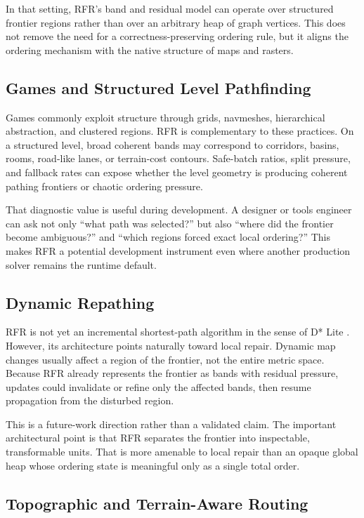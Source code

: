 \documentclass[11pt]{article}
\newcommand{\RFR}{\textsc{RFR}}
\begin{document}
In that setting, \RFR{}'s band and residual model can operate over structured frontier regions rather than over an arbitrary heap of graph vertices. This does not remove the need for a correctness-preserving ordering rule, but it aligns the ordering mechanism with the native structure of maps and rasters.

\subsection{Games and Structured Level Pathfinding}

Games commonly exploit structure through grids, navmeshes, hierarchical abstraction, and clustered regions. \RFR{} is complementary to these practices. On a structured level, broad coherent bands may correspond to corridors, basins, rooms, road-like lanes, or terrain-cost contours. Safe-batch ratios, split pressure, and fallback rates can expose whether the level geometry is producing coherent pathing frontiers or chaotic ordering pressure.

That diagnostic value is useful during development. A designer or tools engineer can ask not only ``what path was selected?'' but also ``where did the frontier become ambiguous?'' and ``which regions forced exact local ordering?'' This makes \RFR{} a potential development instrument even where another production solver remains the runtime default.

\subsection{Dynamic Repathing}

\RFR{} is not yet an incremental shortest-path algorithm in the sense of D* Lite \cite{koenig2002}. However, its architecture points naturally toward local repair. Dynamic map changes usually affect a region of the frontier, not the entire metric space. Because \RFR{} already represents the frontier as bands with residual pressure, updates could invalidate or refine only the affected bands, then resume propagation from the disturbed region.

This is a future-work direction rather than a validated claim. The important architectural point is that \RFR{} separates the frontier into inspectable, transformable units. That is more amenable to local repair than an opaque global heap whose ordering state is meaningful only as a single total order.

\subsection{Topographic and Terrain-Aware Routing}
\end{document}
